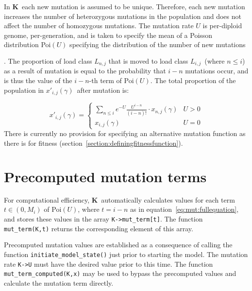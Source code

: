 \documentclass[10pt,twoside,a4paper,fleqn]{report}
\numberwithin{equation}{section}  %
\newcommand{\K}{{\bf K}}
\newcommand{\ProbDist}[2]{\mbox{{#1}$(#2)$}}
\newcommand{\Mi}{\mbox{$M_{i}$}}
\newcommand{\xijg}{\mbox{$x_{i,j}(\gamma)$}}
\newcommand{\xnjg}{\mbox{$x_{n,j}(\gamma)$}}
\newcommand{\xpijg}{\mbox{$x'_{i,j}(\gamma)$}}
\newcommand{\Lij}{\mbox{$L_{i,j}$}}              %
\begin{document}
In \K\ each new mutation is assumed to be unique.  Therefore, each new mutation
increases the number of heterozygous mutations in the population and does not
affect the number of homozygous mutations.  The mutation rate $U$ is
per-diploid genome, per-generation, and is taken to specify the mean of a
Poisson distribution \ProbDist{Poi}{U} specifying the distribution of the
number of new mutations {\cite[and many
others]{Kondrashov:1985:5375,Charlesworth:1990:5337}.  The proportion of
load class $L_{n,j}$ that is moved to load class \Lij\ (where $n \le i$) as
a result of mutation is equal to the probability that $i-n$ mutations
occur, and is thus the value of the $i-n$-th term of \ProbDist{Poi}{U}.
The total proportion of the population in \xpijg\ after mutation is:

\begin{equation}\label{eq:mut:fullequation}
    \xpijg = 
    \begin{cases}
        \sum_{n \le i}{e^{-U} \frac{U^{i-n}}{(i-n)!} \cdot \xnjg} & U > 0 \\
        \xijg & U = 0
    \end{cases}
\end{equation}
There is currently no provision for specifying an alternative mutation function as there is for fitness (section~\ref{section:definingfitnessfunction}).

\section{Precomputed mutation terms}
\label{section:precomputedmutation}

For computational efficiency, \K\ automatically calculates values for each term $t\in(0,\Mi)$ of \ProbDist{Poi}{U}, where $t=i-n$ as in equation~\eqref{eq:mut:fullequation}, and stores these values in the array \lstinline{K->mut_term[t]}.  The function \lstinline{mut_term(K,t)} returns the corresponding element of this array.

\sloppy Precomputed mutation values are established as a consequence of calling the function \lstinline{initiate_model_state()} just prior to starting the model.  The mutation rate \lstinline{K->U} must have the desired value prior to this time.  The function \lstinline{mut_term_computed(K,x)} may be used to bypass the precomputed values and calculate the mutation term directly.

}
\end{document}
